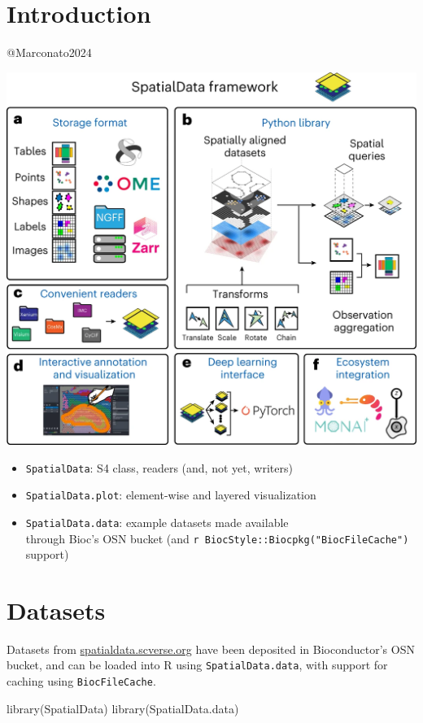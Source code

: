 \documentclass[
  letterpaper,
  DIV=11,
  numbers=noendperiod]{scrreprt}
\newenvironment{Shaded}{\begin{snugshade}}{\end{snugshade}}
\newcommand{\FunctionTok}[1]{\textcolor[rgb]{0.28,0.35,0.67}{#1}}
\newcommand{\NormalTok}[1]{\textcolor[rgb]{0.00,0.23,0.31}{#1}}
\providecommand{\tightlist}{%
  \setlength{\itemsep}{0pt}\setlength{\parskip}{0pt}}\usepackage{longtable,booktabs,array}
\begin{document}
\chapter{Introduction}\label{introduction}

@Marconato2024

\includegraphics[width=0.5\linewidth,height=\textheight,keepaspectratio]{pages/images/SpatialData.png}

\begin{itemize}
\tightlist
\item
  \texttt{SpatialData}: S4 class, readers (and, not yet, writers)
\item
  \texttt{SpatialData.plot}: element-wise and layered visualization
\item
  \texttt{SpatialData.data}: example datasets made available\\
  through Bioc's OSN bucket (and
  \texttt{r\ BiocStyle::Biocpkg("BiocFileCache")} support)
\end{itemize}


\chapter{Datasets}\label{datasets}

Datasets from
\href{https://spatialdata.scverse.org/en/latest/tutorials/notebooks/datasets/README.html}{spatialdata.scverse.org}
have been deposited in Bioconductor's OSN bucket, and can be loaded into
R using \texttt{SpatialData.data}, with support for caching using
\texttt{BiocFileCache}.

\begin{Shaded}
\begin{Highlighting}[]
\FunctionTok{library}\NormalTok{(SpatialData)}
\FunctionTok{library}\NormalTok{(SpatialData.data)}
\end{Highlighting}
\end{Shaded}
\end{document}
